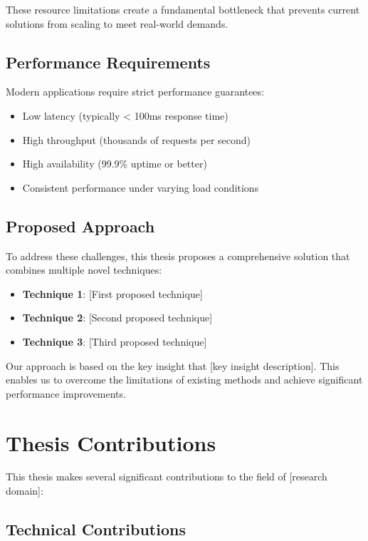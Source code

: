 These resource limitations create a fundamental bottleneck that prevents current solutions from scaling to meet real-world demands.

\subsection{Performance Requirements}

Modern applications require strict performance guarantees:
\begin{itemize}
    \item Low latency (typically < 100ms response time)
    \item High throughput (thousands of requests per second)
    \item High availability (99.9\% uptime or better)
    \item Consistent performance under varying load conditions
\end{itemize}

\subsection{Proposed Approach}

To address these challenges, this thesis proposes a comprehensive solution that combines multiple novel techniques:
\begin{itemize}
    \item \textbf{Technique 1}: [First proposed technique]
    \item \textbf{Technique 2}: [Second proposed technique] 
    \item \textbf{Technique 3}: [Third proposed technique]
\end{itemize}

Our approach is based on the key insight that [key insight description]. This enables us to overcome the limitations of existing methods and achieve significant performance improvements.

\section{Thesis Contributions}

This thesis makes several significant contributions to the field of [research domain]:

\subsection{Technical Contributions}

